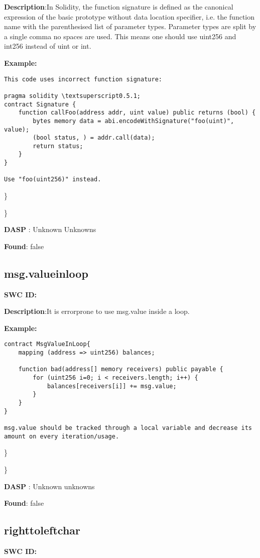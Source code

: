 \documentclass{article}
\begin{document}
\textbf{Description}:In Solidity, the function signature is defined as the canonical expression of the basic prototype without data location specifier, i.e. the function name with the parenthesised list of parameter types. Parameter types are split by a single comma \textendash  no spaces are used. This means one should use uint256 and int256 instead of uint or int.


\textbf{Example:} 
\begin{verbatim}
This code uses incorrect function signature:

pragma solidity \textsuperscript0.5.1;
contract Signature {
    function callFoo(address addr, uint value) public returns (bool) {
        bytes memory data = abi.encodeWithSignature("foo(uint)", value);
        (bool status, ) = addr.call(data);
        return status;
    }
}

Use "foo(uint256)" instead.

\end{verbatim}\} 

\} 

\textbf{DASP} : Unknown Unknowns

\textbf{Found}: false

\subsection{msg.value\textunderscore in\textunderscore loop} 
\textbf{SWC \textunderscore ID:} 

\textbf{Description}:It is error\textendash prone to use msg.value inside a loop.


\textbf{Example:} 
\begin{verbatim}
contract MsgValueInLoop{
    mapping (address => uint256) balances;

    function bad(address[] memory receivers) public payable {
        for (uint256 i=0; i < receivers.length; i++) {
            balances[receivers[i]] += msg.value;
        }
    }
}

msg.value should be tracked through a local variable and decrease its amount on every iteration/usage.

\end{verbatim}\} 

\} 

\textbf{DASP} : Unknown unknowns

\textbf{Found}: false

\subsection{right\textunderscore to\textunderscore left\textunderscore char} 
\textbf{SWC \textunderscore ID:} 
\end{document}
